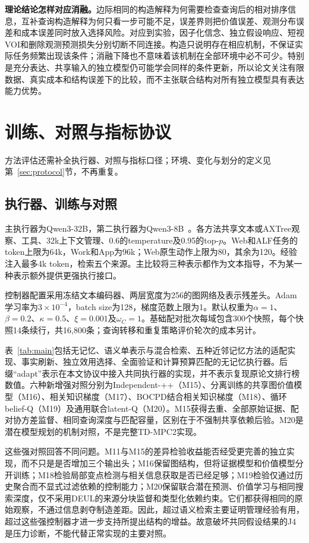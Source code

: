 \documentclass[sigconf,anonymous,review]{acmart}
\theoremstyle{zhplain}
\begin{document}
\textbf{理论结论怎样对应消融。}边际相同的构造解释为何需要检查查询后的相对排序信息，互补查询构造解释为何只看一步可能不足，误差界则把价值误差、观测分布误差和成本误差同时放入选择风险。对应到实验，因子化信念、独立假设响应、短视VOI和删除观测预测损失分别切断不同连接。构造只说明存在相应机制，不保证实际任务频繁出现该条件；消融下降也不意味着该机制在全部环境中必不可少。特别是充分表达、共享输入的独立模型仍可能学会同样的条件更新，所以论文关注有限数据、真实成本和结构误差下的比较，而不主张联合结构对所有独立模型具有表达能力优势。


\section{训练、对照与指标协议}
\label{sec:evalproto}
方法评估还需补全执行器、对照与指标口径；环境、变化与划分的定义见第~\ref{sec:protocol}节，不再重复。

\subsection{执行器、训练与对照}
主执行器为Qwen3-32B，第二执行器为Qwen3-8B~\cite{qwen32,qwen8}。各方法共享文本或AXTree观察、工具、32k上下文管理、0.6的temperature及0.95的top-\(p\)。Web和ALF任务的token上限为64k，Work和App为96k；Web原生动作上限为80，其余为120。经验注入最多4k token，检索五个来源。主比较将三种表示都作为文本指导，不为某一种表示额外提供更强执行接口。

控制器配置采用冻结文本编码器、两层宽度为256的图网络及表示残差头。Adam学习率为\(3\times10^{-4}\)，batch size为128，梯度范数上限为1。默认权重为\(\alpha=1\)、\(\beta=0.2\)、\(\kappa=0.5\)、\(\xi=0.001\)及\(\omega_C=1\)。基础配对批次每域包含300个快照，每个快照14条续行，共16,800条；查询转移和重复策略评价轮次的成本另计。

表~\ref{tab:main}包括无记忆、语义单表示与混合检索、五种近邻记忆方法的适配实现、事实刷新、独立效用选择、全面验证和计算预算匹配的无记忆执行器。后缀``adapt''表示在本文协议中接入共同执行器的实现，并不表示复现原论文排行榜数值。六种新增强对照分别为Independent-++（M15）、分离训练的共享图价值模型（M16）、相关知识梯度（M17）、BOCPD结合相关知识梯度（M18）、循环belief-Q（M19）及通用联合latent-Q（M20）。M15获得去重、全部原始证据、配对协方差监督、相同查询深度与匹配容量，区别在于不强制共享依赖后验。M20是潜在模型规划的机制对照，不是完整TD-MPC2实现。

这些强对照回答不同问题。M11与M15的差异检验收益能否经受更完善的独立实现，而不只是是否增加三个输出头；M16保留图结构，但将证据模型和价值模型分开训练；M18检验局部变点检测与相关信息获取是否已经足够；M19检验仅通过历史聚合而不显式过滤依赖的控制能力；M20保留联合潜在预测、价值学习与相同搜索深度，仅不采用DEUL的来源分块监督和类型化依赖约束。它们都获得相同的原始观察，不通过信息剥夺制造差距。因此，超过语义检索主要证明管理经验有用，超过这些强控制器才进一步支持所提出结构的增益。故意破坏共同假设结果的J4是压力诊断，不能代替正常实现的主要对照。
\end{document}
